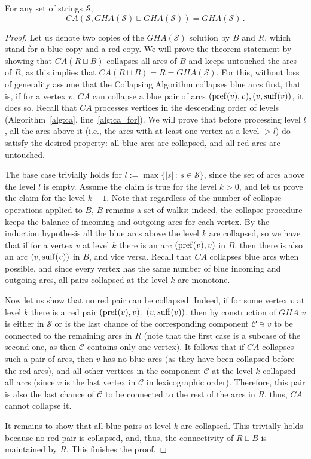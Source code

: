  \begin{theorem}
For any set of strings $\mathcal{S}$,
\[
			CA(\mathcal{S}, GHA(\mathcal{S}) \sqcup GHA(\mathcal{S})) = GHA(\mathcal{S}) \, .
\]
\end{theorem}
\begin{proof}
Let us denote two copies of the $GHA(\mathcal{S})$ solution by $B$ and $R$, which stand for a blue-copy and a red-copy. We will prove the theorem statement by showing that $CA(R \sqcup B)$ collapses all arcs of $B$ and keeps untouched the arcs of $R$, as this implies that $CA(R \sqcup B)=R=GHA(\mathcal{S})$. For this, without loss of generality assume that the Collapsing Algorithm collapses blue arcs first, that is, if for a vertex $v$, $CA$ can collapse a blue pair of arcs $(\operatorname{pref}(v), v), (v, \operatorname{suff}(v))$, it does so. Recall that $CA$ processes vertices in the descending order of levels (Algorithm~\ref{alg:ca}, line~\ref{alg:ca_for}). We will prove that before processing level $l$, all the arcs above it (i.e., the arcs with at least one vertex at a level  $>l$) do satisfy the desired property: all blue arcs are collapsed, and all red arcs are untouched.

The base case trivially holds for $l := \max\{|s| \, : \, s\in\mathcal{S}\}$, since the set of arcs above the level $l$ is empty. Assume the claim is true for the level $k > 0$, and let us prove the claim for the level $k - 1$. Note that regardless of the number of collapse operations applied to $B$, $B$ remains a set of walks: indeed, the collapse procedure keeps the balance of incoming and outgoing arcs for each vertex. By the induction hypothesis all the blue arcs above the level $k$ are collapsed, so we have that if for a vertex $v$ at level $k$ there is an arc $(\operatorname{pref}(v), v)$ in $B$, then there is also an arc $(v, \operatorname{suff}(v))$ in $B$, and vice versa. Recall that $CA$ collapses blue arcs when possible, and since every vertex has the same number of blue incoming and outgoing arcs, all pairs collapsed at the level $k$ are monotone. 
	
Now let us show that no red pair can be collapsed. Indeed, if for some vertex $v$ at level $k$ there is a red pair $(\operatorname{pref}(v), v)$, $(v, \operatorname{suff}(v))$, then by construction of $GHA$ $v$ is either in $\mathcal{S}$ or is the last chance of the corresponding component $\mathcal{C} \ni v$ to be connected to the remaining arcs in $R$ (note that the first case is a subcase of the second one, as then $\mathcal{C}$ contains only one vertex). It follows that if $CA$ collapses such a pair of arcs, then $v$ has no blue arcs (as they have been collapsed before the red arcs), and all other vertices in the component $\mathcal{C}$ at the level $k$ collapsed all arcs (since $v$ is the last vertex in $\mathcal{C}$ in lexicographic order). Therefore, this pair is also the last chance of $\mathcal{C}$ to be connected to the rest of the arcs in $R$, thus, $CA$ cannot collapse it.
	
	It remains to show that all blue pairs at level $k$ are collapsed. This trivially holds because no red pair is collapsed, and, thus, the connectivity of $R \sqcup B$ is maintained by $R$. This finishes the proof.
\end{proof}


